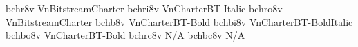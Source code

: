 \documentclass[test]{vnsample}
\begin{document}
\begin{shortsample}
  {bchr8v}   {VnBitstreamCharter}
 {bchri8v}  {VnCharterBT-Italic}
 {bchro8v}  {VnBitstreamCharter}
  {bchb8v}   {VnCharterBT-Bold}
 {bchbi8v}  {VnCharterBT-BoldItalic}
 {bchbo8v}  {VnCharterBT-Bold}
 {bchrc8v}  {N/A}
 {bchbc8v}  {N/A}
\end{shortsample}
\end{document}
